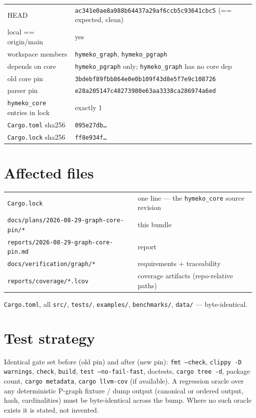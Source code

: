 \documentclass[11pt]{article}
\begin{document}
\begin{longtable}{ll}
\toprule
HEAD & \texttt{ac341e0ae8a988b64437a29af6ccb5c93641cbc5} (== expected, clean) \\
local == origin/main & yes \\
workspace members & \texttt{hymeko\_graph}, \texttt{hymeko\_pgraph} \\
depends on core & \texttt{hymeko\_pgraph} only; \texttt{hymeko\_graph} has no core dep \\
old core pin & \texttt{3bdebf89fbb864e0e0b109f43d8e5f7e9c108726} \\
parser pin & \texttt{e28a205147c48273980e63aa3338ca286974a6ed} \\
\texttt{hymeko\_core} entries in lock & exactly 1 \\
\texttt{Cargo.toml} sha256 & \texttt{095e27db\ldots} \\
\texttt{Cargo.lock} sha256 & \texttt{ff8e934f\ldots} \\
\bottomrule
\end{longtable}

\section{Affected files}

\begin{longtable}{ll}
\toprule
\texttt{Cargo.lock} & one line --- the \texttt{hymeko\_core} source revision \\
\texttt{docs/plans/2026-08-29-graph-core-pin/*} & this bundle \\
\texttt{reports/2026-08-29-graph-core-pin.md} & report \\
\texttt{docs/verification/graph/*} & requirements + traceability \\
\texttt{reports/coverage/*.lcov} & coverage artifacts (repo-relative paths) \\
\bottomrule
\end{longtable}

\texttt{Cargo.toml}, all \texttt{src/}, \texttt{tests/}, \texttt{examples/},
\texttt{benchmarks/}, \texttt{data/} --- byte-identical.

\section{Test strategy}

Identical gate set before (old pin) and after (new pin): \texttt{fmt --check},
\texttt{clippy -D warnings}, \texttt{check}, \texttt{build},
\texttt{test --no-fail-fast}, doctests, \texttt{cargo tree -d}, package count,
\texttt{cargo metadata}, \texttt{cargo llvm-cov} (if available). A regression
oracle over any deterministic P-graph fixture / dump output (canonical or ordered
output, hash, cardinalities) must be byte-identical across the bump. Where no such
oracle exists it is stated, not invented.
\end{document}
